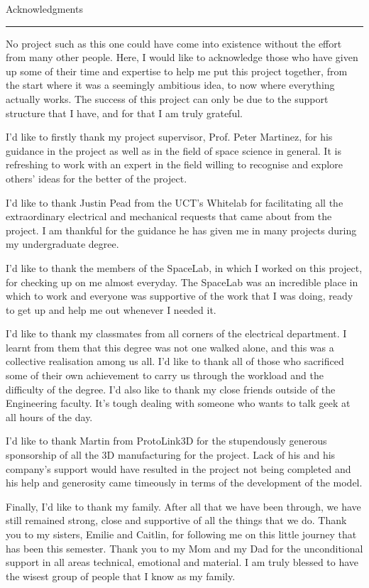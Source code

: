 \pagestyle{plain}

{\Large Acknowledgments}\\
\hrule

No project such as this one could have come into existence without the effort from many other people. Here, I would like to acknowledge those who have given up some of their time and expertise to help me put this project together, from the start where it was a seemingly ambitious idea, to now where everything actually works. The success of this project can only be due to the support structure that I have, and for that I am truly grateful.

I'd like to firstly thank my project supervisor, Prof. Peter Martinez, for his guidance in the project as well as in the field of space science in general. It is refreshing to work with an expert in the field willing to recognise and explore others' ideas for the better of the project.

I'd like to thank Justin Pead from the UCT's Whitelab for facilitating all the extraordinary electrical and mechanical requests that came about from the project. I am thankful for the guidance he has given me in many projects during my undergraduate degree.

I'd like to thank the members of the SpaceLab, in which I worked on this project, for checking up on me almost everyday. The SpaceLab was an incredible place in which to work and everyone was supportive of the work that I was doing, ready to get up and help me out whenever I needed it.

I'd like to thank my classmates from all corners of the electrical department. I learnt from them that this degree was not one walked alone, and this was a collective realisation among us all. I'd like to thank all of those who sacrificed some of their own achievement to carry us through the workload and the difficulty of the degree. I'd also like to thank my close friends outside of the Engineering faculty. It's tough dealing with someone who wants to talk geek at all hours of the day.

I'd like to thank Martin from ProtoLink3D for the stupendously generous sponsorship of all the 3D manufacturing for the project. Lack of his and his company's support would have resulted in the project not being completed and his help and generosity came timeously in terms of the development of the model.

Finally, I'd like to thank my family. After all that we have been through, we have still remained strong, close and supportive of all the things that we do. Thank you to my sisters, Emilie and Caitlin, for following me on this little journey that has been this semester. Thank you to my Mom and my Dad for the unconditional support in all areas technical, emotional and material. I am truly blessed to have the wisest group of people that I know as my family.